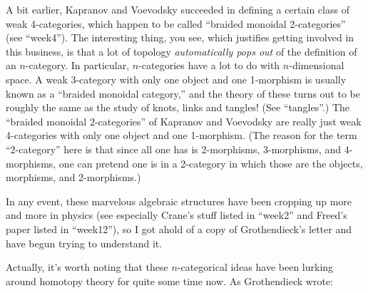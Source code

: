 \documentclass{article}
\begin{document}
A bit earlier, Kapranov and Voevodsky succeeded in defining a certain
class of weak 4-categories, which happen to be called ``braided monoidal
2-categories'' (see ``week4''). The interesting thing, you see, which
justifies getting involved in this business, is that a lot of topology
\emph{automatically pops out} of the definition of an \(n\)-category. In
particular, \(n\)-categories have a lot to do with \(n\)-dimensional
space. A weak 3-category with only one object and one 1-morphism is
usually known as a ``braided monoidal category,'' and the theory of
these turns out to be roughly the same as the study of knots, links and
tangles! (See ``tangles''.) The ``braided monoidal 2-categories'' of
Kapranov and Voevodsky are really just weak 4-categories with only one
object and one 1-morphism. (The reason for the term ``2-category'' here
is that since all one has is 2-morphisms, 3-morphisms, and 4-morphisms,
one can pretend one is in a 2-category in which those are the objects,
morphisms, and 2-morphisms.)

In any event, these marvelous algebraic structures have been cropping up
more and more in physics (see especially Crane's stuff listed in
``week2'' and Freed's paper listed in ``week12''), so I got ahold of a
copy of Grothendieck's letter and have begun trying to understand it.

Actually, it's worth noting that these \(n\)-categorical ideas have been
lurking around homotopy theory for quite some time now. As Grothendieck
wrote:
\end{document}
